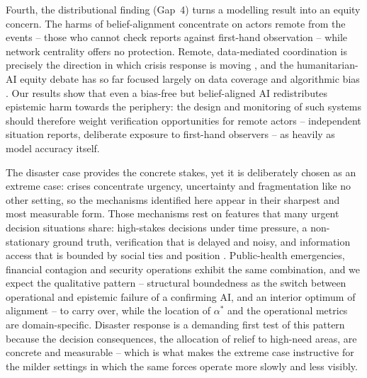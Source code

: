 \documentclass[pdflatex,sn-nature]{sn-jnl}
\begin{document}
Fourth, the distributional finding (Gap~4) turns a modelling result into an equity concern. The harms of belief-alignment concentrate on actors remote from the events -- those who cannot check reports against first-hand observation -- while network centrality offers no protection. Remote, data-mediated coordination is precisely the direction in which crisis response is moving \citep{comes2020coordination}, and the humanitarian-AI equity debate has so far focused largely on data coverage and algorithmic bias \citep{coleman2024weaving,beduschi2022harnessing}. Our results show that even a bias-free but belief-aligned AI redistributes epistemic harm towards the periphery: the design and monitoring of such systems should therefore weight verification opportunities for remote actors -- independent situation reports, deliberate exposure to first-hand observers -- as heavily as model accuracy itself.

The disaster case provides the concrete stakes, yet it is deliberately chosen as an extreme case: crises concentrate urgency, uncertainty and fragmentation like no other setting, so the mechanisms identified here appear in their sharpest and most measurable form. Those mechanisms rest on features that many urgent decision situations share: high-stakes decisions under time pressure, a non-stationary ground truth, verification that is delayed and noisy, and information access that is bounded by social ties and position \citep{svenson1993time,mendonca2001decision,holguin2012unique}. Public-health emergencies, financial contagion and security operations exhibit the same combination, and we expect the qualitative pattern -- structural boundedness as the switch between operational and epistemic failure of a confirming AI, and an interior optimum of alignment -- to carry over, while the location of $\alpha^{*}$ and the operational metrics are domain-specific. Disaster response is a demanding first test of this pattern because the decision consequences, the allocation of relief to high-need areas, are concrete and measurable -- which is what makes the extreme case instructive for the milder settings in which the same forces operate more slowly and less visibly.
\end{document}
